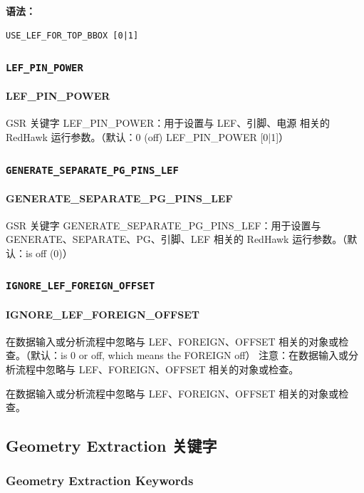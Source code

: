 \textbf{语法：}
\begin{lstlisting}
USE_LEF_FOR_TOP_BBOX [0|1]
\end{lstlisting}

\subsubsection{\texttt{LEF_PIN_POWER}}
\paragraph*{LEF_PIN_POWER}

GSR 关键字 LEF_PIN_POWER：用于设置与 LEF、引脚、电源 相关的 RedHawk 运行参数。（默认：0 (off) LEF_PIN_POWER [0|1]）

\subsubsection{\texttt{GENERATE_SEPARATE_PG_PINS_LEF}}
\paragraph*{GENERATE_SEPARATE_PG_PINS_LEF}

GSR 关键字 GENERATE_SEPARATE_PG_PINS_LEF：用于设置与 GENERATE、SEPARATE、PG、引脚、LEF 相关的 RedHawk 运行参数。（默认：is off (0)）

\subsubsection{\texttt{IGNORE_LEF_FOREIGN_OFFSET}}
\paragraph*{IGNORE_LEF_FOREIGN_OFFSET}

在数据输入或分析流程中忽略与 LEF、FOREIGN、OFFSET 相关的对象或检查。（默认：is 0 or off, which means the FOREIGN off） 注意：在数据输入或分析流程中忽略与 LEF、FOREIGN、OFFSET 相关的对象或检查。

\begin{noteBox}
在数据输入或分析流程中忽略与 LEF、FOREIGN、OFFSET 相关的对象或检查。
\end{noteBox}

\subsection{Geometry Extraction 关键字}
\subsubsection*{Geometry Extraction Keywords}

